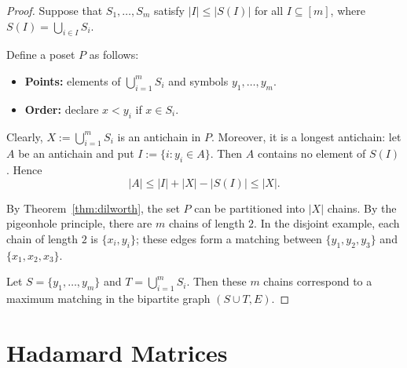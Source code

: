 \documentclass[11pt, a4paper]{ctexrep}
\begin{document}
\begin{proof}
    Suppose that $S_1,\dots,S_m$ satisfy $|I|\leqslant |S(I)|$ for all $I\subseteq [m]$, where
    $S(I)=\bigcup_{i\in I} S_i$.

    Define a poset $P$ as follows:
    \begin{itemize}
        \item \textbf{Points:} elements of $\bigcup_{i=1}^m S_i$ and symbols $y_1,\dots,y_m$.
        \item \textbf{Order:} declare $x<y_i$ if $x\in S_i$.
    \end{itemize}

    Clearly, $X:=\bigcup_{i=1}^m S_i$ is an antichain in $P$.
    Moreover, it is a longest antichain: let $A$ be an antichain and put $I:=\{i:y_i\in A\}$.
    Then $A$ contains no element of $S(I)$.
    Hence
    \[
        |A|\leqslant |I|+|X|-|S(I)|\leqslant |X|.
    \]

    By Theorem~\ref{thm:dilworth}, the set $P$ can be partitioned into $|X|$ chains.
    By the pigeonhole principle, there are $m$ chains of length $2$.
    In the disjoint example, each chain of length $2$ is $\{x_i,y_i\}$; these edges form a matching between $\{y_1,y_2,y_3\}$ and $\{x_1,x_2,x_3\}$.
    \begin{center}
    \end{center}

    Let $S=\{y_1,\dots,y_m\}$ and $T=\bigcup_{i=1}^m S_i$.
    Then these $m$ chains correspond to a maximum matching in the bipartite graph $(S\cup T,E)$.
\end{proof}

\section{Hadamard Matrices}
\end{document}
